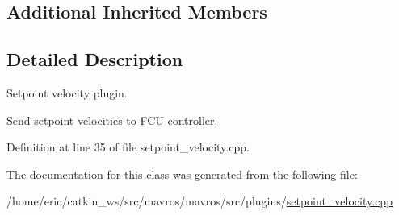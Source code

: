\subsection*{Additional Inherited Members}


\subsection{Detailed Description}
Setpoint velocity plugin. 

Send setpoint velocities to F\+CU controller. 

Definition at line 35 of file setpoint\+\_\+velocity.\+cpp.



The documentation for this class was generated from the following file\+:\begin{DoxyCompactItemize}
\item 
/home/eric/catkin\+\_\+ws/src/mavros/mavros/src/plugins/\mbox{\hyperlink{setpoint__velocity_8cpp}{setpoint\+\_\+velocity.\+cpp}}\end{DoxyCompactItemize}
